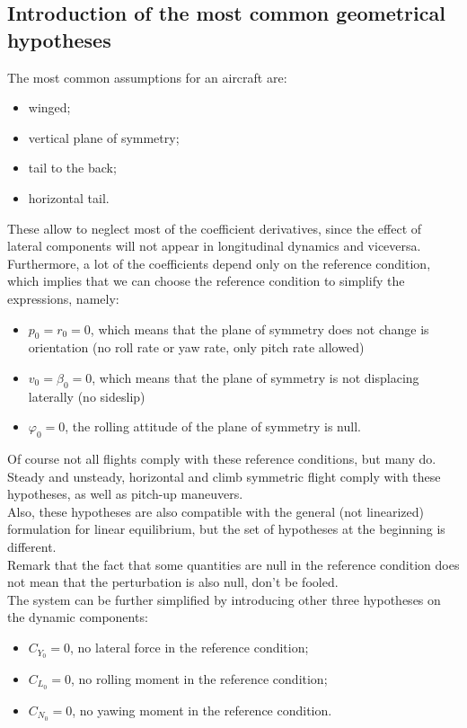 \subsection{Introduction of the most common geometrical hypotheses}
The most common assumptions for an aircraft are:
\begin{itemize}
    \item winged;
    \item vertical plane of symmetry;
    \item tail to the back;
    \item horizontal tail.
\end{itemize}
These allow to neglect most of the coefficient derivatives, since the effect of lateral components will not appear in longitudinal dynamics and viceversa.
\\
Furthermore, a lot of the coefficients depend only on the reference condition, which implies that we can choose the reference condition to simplify the expressions, namely:
\begin{itemize}
    \item $p_0 = r_0 = 0$, which means that the plane of symmetry does not change is orientation (no roll rate or yaw rate, only pitch rate allowed)
    \item $v_0 = \beta_0 = 0$, which means that the plane of symmetry is not displacing laterally (no sideslip)
    \item $\varphi_0 = 0$, the rolling attitude of the plane of symmetry is null.
\end{itemize}
Of course not all flights comply with these reference conditions, but many do. Steady and unsteady, horizontal and climb symmetric flight comply with these hypotheses, as well as pitch-up maneuvers.
\\
Also, these hypotheses are also compatible with the general (not linearized) formulation for linear equilibrium, but the set of hypotheses at the beginning is different.
\\
Remark that the fact that some quantities are null in the reference condition does not mean that the perturbation is also null, don't be fooled.
\\
The system can be further simplified by introducing other three hypotheses on the dynamic components:
\begin{itemize}
    \item $C_{Y_0}=0$, no lateral force in the reference condition;
    \item $C_{L_0}=0$, no rolling moment in the reference condition;
    \item $C_{N_0}=0$, no yawing moment in the reference condition.
\end{itemize}
